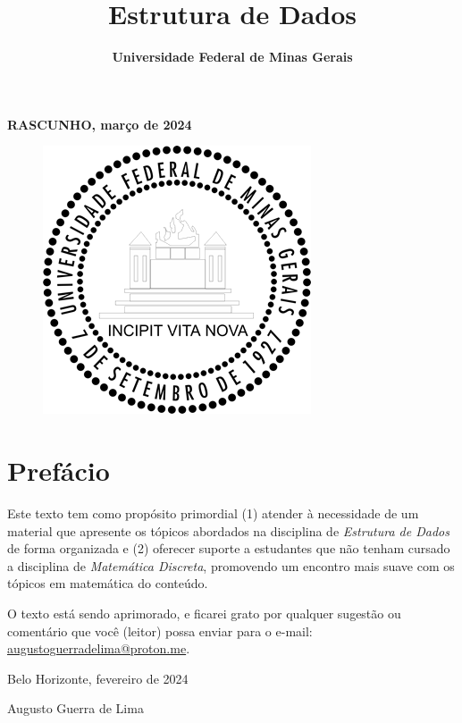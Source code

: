 \documentclass{article}
\title{\Huge\textbf{Estrutura de Dados}}
\author{}
\date{\textbf{Universidade Federal de Minas Gerais}}
\begin{document}
\maketitle
\textbf{RASCUNHO, março de 2024}
\begin{figure}
  \centering
  \includegraphics[width=0.2\linewidth]{img/UFMG.png}
\end{figure}

\newpage

\large

\section*{Prefácio}

Este texto tem como propósito primordial (1) atender à necessidade de um material que apresente os tópicos abordados na disciplina de \textit{Estrutura de Dados} de forma organizada e (2) oferecer suporte a estudantes que não tenham cursado a disciplina de \textit{Matemática Discreta}, promovendo um encontro mais suave com os tópicos em matemática do conteúdo.

O texto está sendo aprimorado, e ficarei grato por qualquer sugestão ou comentário que você (leitor) possa enviar para o e-mail: \href{mailto:augustoguerradelima@proton.me}{augustoguerradelima@proton.me}.
\vspace{0.5cm}

{\raggedleft
Belo Horizonte, fevereiro de 2024

Augusto Guerra de Lima

\smiley{}
\par}

\newpage

\tableofcontents

\newpage








\end{document}
